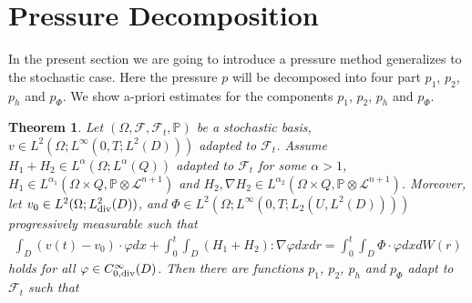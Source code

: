 \documentclass[reqno]{amsart}
\newtheorem{Theorem}{Theorem}[section]
\theoremstyle{definition}
\theoremstyle{remark}
\numberwithin{equation}{section} \allowdisplaybreaks
\begin{document}
\section{Pressure Decomposition}
In the present section we are going to introduce a pressure method generalizes \cite{JW} to the stochastic case.
Here the pressure $p$ will be decomposed into four part $p_1$, $p_2$, $p_h$ and $p_\Phi$.
We show a-priori estimates for the components $p_1$, $p_2$, $p_h$ and $p_\Phi$.
\begin{Theorem}\label{theorem3.1}
Let $(\Omega, \mathscr{F}, \mathscr{F}_{t}, \mathbb{P})$ be a
stochastic basis, $v\in L^2(\Omega; L^\infty(0,T;L^2(D)))$ adapted
to $\mathscr{F}_t$. Assume $H_1+H_2\in L^\alpha(\Omega;
L^\alpha(Q))$ adapted to $\mathscr{F}_t$ for some $\alpha>1$,
$H_1\in L^{\alpha_1}(\Omega\times Q,\mathbb{P}\otimes
\mathcal{L}^{n+1})$ and $H_2,\nabla H_2\in L^{\alpha_2}(\Omega\times
Q,\mathbb{P}\otimes \mathcal{L}^{n+1})$. Moreover, let $v_0\in
L^2(\Omega; L^2_{\rm{div}}(D))$, and $\Phi\in L^2(\Omega;
L^\infty(0,T;L_2({U},L^2(D))))$ progressively measurable such that
\begin{equation}\label{3.1}
\begin{split}
\int_{D}(v(t)-v_0)\cdot\varphi
dx+\int_0^t\!\!\!\int_{D}(H_1+H_2):\nabla\varphi
dxdr=\int_0^t\!\!\!\int_{D}\Phi\cdot\varphi dx dW(r)
\end{split}
\end{equation}
holds for all $\varphi\in C_{0,\rm{div}}^\infty(D)$. Then there are
functions $p_1$, $p_2$, $p_h$ and $p_\Phi$ adapt to $\mathscr{F}_t$
such that


\end{Theorem}
\end{document}
